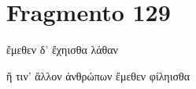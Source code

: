 






\section{Fragmento 129}

\begin{gkverse}
ἔμεθεν δ’ ἔχηισθα λάθαν\\

\medskip 

\hspace*{17mm}{\minion [...]}

ἤ τιν’ ἄλλον ἀνθρώπων ἔμεθεν φίληισθα

\end{gkverse}


